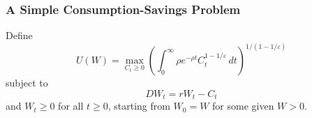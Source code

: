 \documentclass[11pt,english]{article}
\begin{document}
%
%
%
%

\subsubsection{A Simple Consumption-Savings Problem}

Define
\[
U(W) = \max_{C_t \geq 0} \left( \int_0^{\infty} \rho e^{-\rho t} C_t^{1-1/\varepsilon} \, dt \right)^{1/(1-1/\varepsilon)}
\]
subject to
\[
DW_t = rW_t - C_t
\]
and $W_t \geq 0$ for all $t \geq 0$, starting from $W_0 = W$ for some given $W > 0$.
\end{document}
